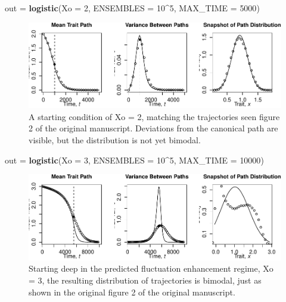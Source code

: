 \documentclass[
]{rescience}
\newenvironment{Shaded}{\begin{snugshade}}{\end{snugshade}}
\newcommand{\DataTypeTok}[1]{\textcolor[rgb]{0.13,0.29,0.53}{#1}}
\newcommand{\DecValTok}[1]{\textcolor[rgb]{0.00,0.00,0.81}{#1}}
\newcommand{\KeywordTok}[1]{\textcolor[rgb]{0.13,0.29,0.53}{\textbf{#1}}}
\newcommand{\NormalTok}[1]{#1}
\newcommand{\OperatorTok}[1]{\textcolor[rgb]{0.81,0.36,0.00}{\textbf{#1}}}
\newcommand{\StringTok}[1]{\textcolor[rgb]{0.31,0.60,0.02}{#1}}
\begin{document}
\begin{Shaded}
\begin{Highlighting}[]
\NormalTok{out =}\StringTok{ }\KeywordTok{logistic}\NormalTok{(}\DataTypeTok{Xo =} \DecValTok{2}\NormalTok{,  }\DataTypeTok{ENSEMBLES =} \DecValTok{10}\OperatorTok{^}\DecValTok{5}\NormalTok{, }\DataTypeTok{MAX_TIME =} \DecValTok{5000}\NormalTok{)}
\end{Highlighting}
\end{Shaded}

\begin{figure}
\centering
\includegraphics{article_files/figure-latex/unnamed-chunk-3-1.pdf}
\caption{A starting condition of Xo = 2, matching the trajectories seen
figure 2 of the original manuscript. Deviations from the canonical path
are visible, but the distribution is not yet bimodal.}
\end{figure}

\begin{Shaded}
\begin{Highlighting}[]
\NormalTok{out =}\StringTok{ }\KeywordTok{logistic}\NormalTok{(}\DataTypeTok{Xo =} \DecValTok{3}\NormalTok{,  }\DataTypeTok{ENSEMBLES =} \DecValTok{10}\OperatorTok{^}\DecValTok{5}\NormalTok{, }\DataTypeTok{MAX_TIME =} \DecValTok{10000}\NormalTok{)}
\end{Highlighting}
\end{Shaded}

\begin{figure}
\centering
\includegraphics{article_files/figure-latex/unnamed-chunk-4-1.pdf}
\caption{Starting deep in the predicted fluctuation enhancement regime,
Xo = 3, the resulting distribution of trajectories is bimodal, just as
shown in the original figure 2 of the original manuscript.}
\end{figure}
\end{document}
